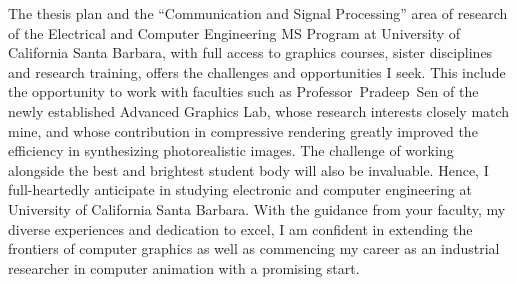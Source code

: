 \documentclass[a4paper, 11pt]{article}
\begin{document}
The thesis plan and the ``Communication and Signal Processing'' area of research of the Electrical and Computer Engineering MS Program at University of California Santa Barbara, with full access to graphics courses, sister disciplines and research training, offers the challenges and opportunities I seek. This include the opportunity to work with faculties such as \mbox{Professor~Pradeep~Sen} of the newly established Advanced Graphics Lab, whose research interests closely match mine, and whose contribution in compressive rendering greatly improved the efficiency in synthesizing photorealistic images. The challenge of working alongside the best and brightest student body will also be invaluable. Hence, I full-heartedly anticipate in studying electronic and computer engineering at University of California Santa Barbara. With the guidance from your faculty, my diverse experiences and dedication to excel, I am confident in extending the frontiers of computer graphics as well as commencing my career as an industrial researcher in computer animation with a promising start.

\end{document}
